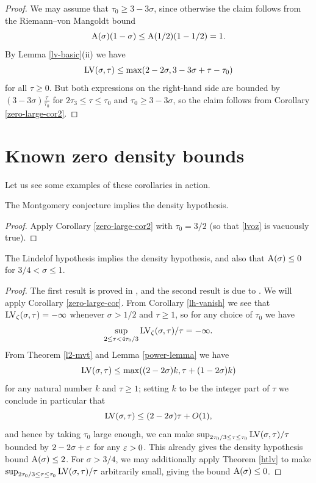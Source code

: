\begin{proof}  We may assume that $\tau_0 \geq 3-3\sigma$, since otherwise the claim follows from the Riemann--von Mangoldt bound
    $$ \mathrm{A}(\sigma)(1-\sigma) \leq \mathrm{A}(1/2)(1-1/2) = 1.$$
    By Lemma \ref{lv-basic}(ii) we have
$$ \mathrm{LV}(\sigma,\tau) \leq \max( 2-2\sigma, 3-3\sigma + \tau - \tau_0 )$$
for all $\tau \geq 0$.  But both expressions on the right-hand side are bounded by $(3-3\sigma) \frac{\tau}{\tau_0}$ for $2\tau_3 \leq \tau \leq \tau_0$ and $\tau_0 \geq 3-3\sigma$, so the claim follows from Corollary \ref{zero-large-cor2}.
\end{proof}

\section{Known zero density bounds}

Let us see some examples of these corollaries in action.

\begin{theorem}\label{montgomery_implies_density} The Montgomery conjecture implies the density hypothesis.
\end{theorem}

\begin{proof}  Apply Corollary \ref{zero-large-cor2} with $\tau_0=3/2$ (so that \eqref{lvoz} is vacuously true).
\end{proof}

\begin{theorem}\label{lindelof_implies_density} The Lindelof hypothesis implies the density hypothesis, and also that $\mathrm{A}(\sigma) \leq 0$ for $3/4 < \sigma \leq 1$.
\end{theorem}

\begin{proof} The first result is proved in \cite{ingham_estimation_1940}, and the second result is due to \cite{halasz_distribution_1969}. We will apply Corollary \ref{zero-large-cor}.  From Corollary \ref{lh-vanish} we see that $\mathrm{LV}_\zeta(\sigma,\tau) = -\infty$ whenever $\sigma > 1/2$ and $\tau \geq 1$, so for any choice of $\tau_0$ we have
$$ \sup_{2 \leq \tau < 4\tau_0/3} \mathrm{LV}_\zeta(\sigma,\tau)/\tau = -\infty.$$
From Theorem \ref{l2-mvt} and Lemma \ref{power-lemma} we have
\begin{equation}\label{ap}
     \mathrm{LV}(\sigma,\tau) \leq \max( (2-2\sigma)k, \tau + (1 - 2 \sigma)k )
\end{equation}
for any natural number $k$ and $\tau \geq 1$; setting $k$ to be the integer part of $\tau$ we conclude in particular that
$$ \mathrm{LV}(\sigma,\tau) \leq (2-2\sigma)\tau + O(1),$$
and hence by taking $\tau_0$ large enough, we can make
$\sup_{2\tau_0/3 \leq \tau \leq \tau_0} \mathrm{LV}(\sigma,\tau)/\tau$ bounded by $2-2\sigma + \varepsilon$ for any $\varepsilon>0$.  This already gives the density hypothesis bound $\mathrm{A}(\sigma) \leq 2$.  For $\sigma > 3/4$, we may additionally apply Theorem \ref{htlv} to make
$\sup_{2\tau_0/3 \leq \tau \leq \tau_0} \mathrm{LV}(\sigma,\tau)/\tau$ arbitrarily small, giving the bound $\mathrm{A}(\sigma) \leq 0$.
\end{proof}

